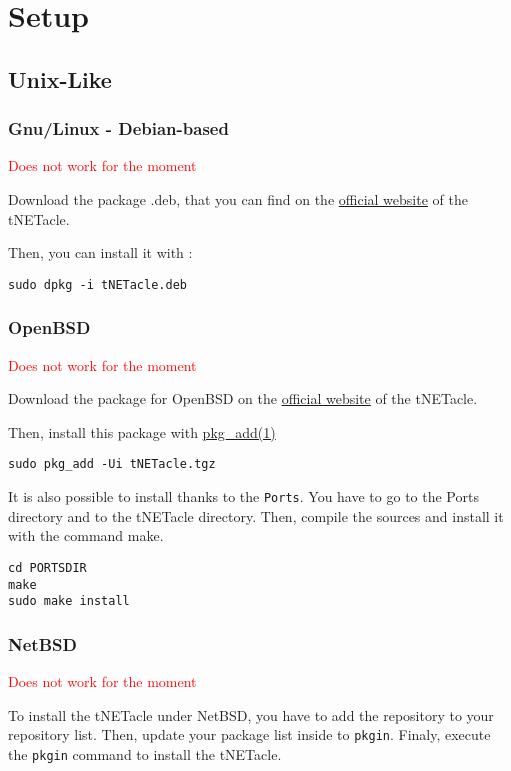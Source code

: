 \section{Setup}
\subsection{Unix-Like}
\subsubsection{Gnu/Linux - Debian-based}
\textcolor{red}{Does not work for the moment}

Download the package .deb, that you can find on the \href{http://eip.epitech.eu/2013/tnetacle/tnetacle.html}{official website} of the tNETacle.

Then, you can install it with :

\begin{lstlisting}
sudo dpkg -i tNETacle.deb
\end{lstlisting}

\subsubsection{OpenBSD}
\textcolor{red}{Does not work for the moment}

Download the package for OpenBSD on the \href{http://eip.epitech.eu/2013/tnetacle/tnetacle.html}{official website} of the tNETacle.

Then, install this package with \href{http://www.openbsd.org/faq/fr/faq15.html}{pkg\_add(1)}

\begin{lstlisting}
sudo pkg_add -Ui tNETacle.tgz
\end{lstlisting}

It is also possible to install thanks to the \texttt{Ports}.
You have to go to the Ports directory and to the tNETacle directory.
Then, compile the sources and install it with the command make.

\begin{lstlisting}
cd PORTSDIR
make
sudo make install
\end{lstlisting}

\subsubsection{NetBSD}
\textcolor{red}{Does not work for the moment}

To install the tNETacle under NetBSD, you have to add
the repository to your repository list.
Then, update your package list inside to \texttt{pkgin}.
Finaly, execute the \texttt{pkgin} command to install the tNETacle.

